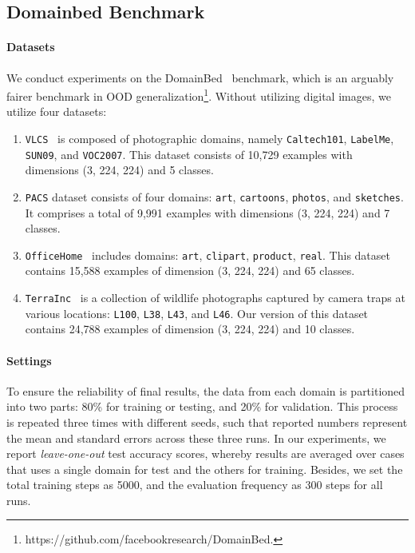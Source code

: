 \documentclass{article} \usepackage{iclr2024_conference,times}
\begin{document}
\subsection{Domainbed Benchmark}
\paragraph{Datasets} We conduct experiments on the DomainBed~\citep{Setup:DomainBed} benchmark, which is an arguably fairer benchmark in OOD generalization\footnote{{{https://github.com/facebookresearch/DomainBed.}}}. Without utilizing digital images, we utilize four datasets: 
\begin{enumerate}
	\item \texttt{VLCS}~\citep{Dataset:VLCS}  is composed of photographic domains, namely \texttt{Caltech101}, \texttt{LabelMe}, \texttt{SUN09}, and \texttt{VOC2007}. This dataset consists of 10,729 examples with dimensions (3, 224, 224) and 5 classes.
	
	\item \texttt{PACS} dataset \citep{Dataset:PACS} consists of four domains: \texttt{art}, \texttt{cartoons}, \texttt{photos}, and \texttt{sketches}. It comprises a total of 9,991 examples with dimensions (3, 224, 224) and 7 classes.
	
	\item \texttt{OfficeHome}~\citep{Dataset:OfficeHome} includes domains: \texttt{art}, \texttt{clipart}, \texttt{product}, \texttt{real}. This
	dataset contains 15,588 examples of dimension (3, 224, 224) and 65 classes.
	
	\item \texttt{TerraInc}~\citep{Dataset:TerraIncognita} is a collection of wildlife photographs captured by camera traps at various locations: \texttt{L100}, \texttt{L38}, \texttt{L43}, and \texttt{L46}. Our version of this dataset contains 24,788 examples of dimension (3, 224, 224) and 10 classes.
\end{enumerate}





\paragraph{Settings} To ensure the reliability of final results, the data from each domain is partitioned into two parts: 80\% for training or testing, and 20\% for validation. This process is repeated three times with different seeds, such that reported numbers represent the mean and standard errors across these three runs. 
In our experiments, we report \textit{leave-one-out} test accuracy scores, whereby results are averaged over cases that uses a single domain for test and the others for training. 
Besides, we set the total training steps as 5000, and the evaluation frequency as 300 steps for all runs. 
\end{document}
